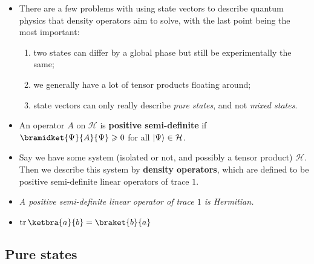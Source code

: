 \documentclass[10pt]{article}
\DeclarePairedDelimiter\ket{\lvert}{\rangle}
\newcommand{\hilb}{\mathcal{H}}
\DeclareMathOperator{\tr}{tr}
\begin{document}
            \begin{itemize}
                \item There are a few problems with using state vectors to describe quantum physics that density operators aim to solve, with the last point being the most important:
                    \begin{enumerate}
                        \item two states can differ by a global phase but still be experimentally the same;
                        \item we generally have a lot of tensor products floating around;
                        \item state vectors can only really describe \emph{pure states}, and not \emph{mixed states}.
                    \end{enumerate}
                \item An operator $A$ on $\hilb$ is \textbf{positive semi-definite} if $\bramidket{\Psi}{A}{\Psi}\geqslant0$ for all \mbox{$\ket{\Psi}\in\hilb$.}
                \item Say we have some system (isolated or not, and possibly a tensor product) $\hilb$.
                    Then we describe this system by \textbf{density operators}, which are defined to be positive semi-definite linear operators of trace $1$.
                \item \emph{A positive semi-definite linear operator of trace $1$ is Hermitian.}

                \item $\tr\ketbra{a}{b}=\braket{b}{a}$

            \end{itemize}
                
        \subsection{Pure states}
\end{document}
